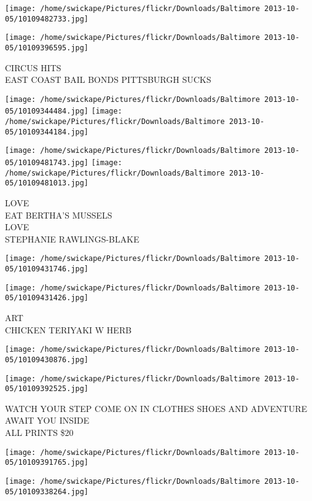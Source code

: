 \documentclass[10pt,letterpaper]{article}
\begin{document}
\texttt{[image: /home/swickape/Pictures/flickr/Downloads/Baltimore 2013-10-05/10109482733.jpg]}

\vspace{0.25in}
\texttt{[image: /home/swickape/Pictures/flickr/Downloads/Baltimore 2013-10-05/10109396595.jpg]}

CIRCUS HITS\\
EAST COAST BAIL BONDS PITTSBURGH SUCKS
\pagebreak

\texttt{[image: /home/swickape/Pictures/flickr/Downloads/Baltimore 2013-10-05/10109344484.jpg]}
\texttt{[image: /home/swickape/Pictures/flickr/Downloads/Baltimore 2013-10-05/10109344184.jpg]}

\texttt{[image: /home/swickape/Pictures/flickr/Downloads/Baltimore 2013-10-05/10109481743.jpg]}
\texttt{[image: /home/swickape/Pictures/flickr/Downloads/Baltimore 2013-10-05/10109481013.jpg]}

LOVE\\
EAT BERTHA'S MUSSELS\\
LOVE\\
STEPHANIE RAWLINGS{-}BLAKE
\pagebreak

\texttt{[image: /home/swickape/Pictures/flickr/Downloads/Baltimore 2013-10-05/10109431746.jpg]}

\vspace{0.25in}
\texttt{[image: /home/swickape/Pictures/flickr/Downloads/Baltimore 2013-10-05/10109431426.jpg]}

ART\\
CHICKEN TERIYAKI W HERB
\pagebreak

\texttt{[image: /home/swickape/Pictures/flickr/Downloads/Baltimore 2013-10-05/10109430876.jpg]}

\vspace{0.25in}
\texttt{[image: /home/swickape/Pictures/flickr/Downloads/Baltimore 2013-10-05/10109392525.jpg]}

WATCH YOUR STEP COME ON IN CLOTHES SHOES AND ADVENTURE AWAIT YOU INSIDE\\
ALL PRINTS \$20
\pagebreak

\texttt{[image: /home/swickape/Pictures/flickr/Downloads/Baltimore 2013-10-05/10109391765.jpg]}

\vspace{0.25in}
\texttt{[image: /home/swickape/Pictures/flickr/Downloads/Baltimore 2013-10-05/10109338264.jpg]}
\end{document}
